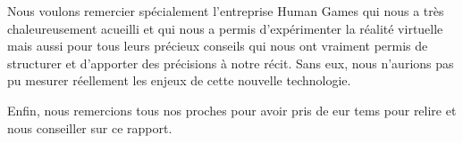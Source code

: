 \documentclass[12pt, a4paper]{report}
\begin{document}
Nous voulons remercier spécialement l'entreprise Human Games qui nous a très chaleureusement acueilli et qui nous a permis d'expérimenter la réalité virtuelle mais aussi pour tous leurs précieux conseils qui nous ont vraiment permis de structurer et d'apporter des précisions à notre récit. Sans eux, nous n'aurions pas pu mesurer réellement les enjeux de cette nouvelle technologie.

Enfin, nous remercions tous nos proches pour avoir pris de eur tems pour relire et nous conseiller sur ce rapport.



{\color{white} \cite{1, 2, 3, 4, 5, 6, 7, 8, 9, 10, 11, 12, 13, 14}}

\appendix{}

\listoffigures{}

\printbibliography{}































\end{document}
